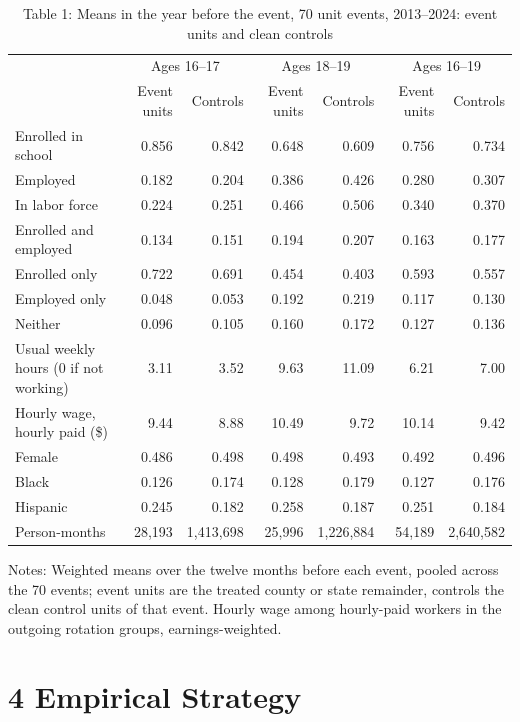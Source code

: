 \documentclass[12pt]{article}
\begin{document}
\begin{table}
\centering
\caption{Table 1: Means in the year before the event, 70 unit events, 2013--2024: event units and clean controls}

\small
\begin{tabular}{lrrrrrr}
\toprule
 & \multicolumn{2}{c}{Ages 16--17} & \multicolumn{2}{c}{Ages 18--19} & \multicolumn{2}{c}{Ages 16--19} \\

 & Event units & Controls & Event units & Controls & Event units & Controls \\
\midrule
Enrolled in school & 0.856 & 0.842 & 0.648 & 0.609 & 0.756 & 0.734 \\
Employed & 0.182 & 0.204 & 0.386 & 0.426 & 0.280 & 0.307 \\
In labor force & 0.224 & 0.251 & 0.466 & 0.506 & 0.340 & 0.370 \\
Enrolled and employed & 0.134 & 0.151 & 0.194 & 0.207 & 0.163 & 0.177 \\
Enrolled only & 0.722 & 0.691 & 0.454 & 0.403 & 0.593 & 0.557 \\
Employed only & 0.048 & 0.053 & 0.192 & 0.219 & 0.117 & 0.130 \\
Neither & 0.096 & 0.105 & 0.160 & 0.172 & 0.127 & 0.136 \\
Usual weekly hours (0 if not working) & 3.11 & 3.52 & 9.63 & 11.09 & 6.21 & 7.00 \\
Hourly wage, hourly paid (\$) & 9.44 & 8.88 & 10.49 & 9.72 & 10.14 & 9.42 \\
Female & 0.486 & 0.498 & 0.498 & 0.493 & 0.492 & 0.496 \\
Black & 0.126 & 0.174 & 0.128 & 0.179 & 0.127 & 0.176 \\
Hispanic & 0.245 & 0.182 & 0.258 & 0.187 & 0.251 & 0.184 \\
Person-months & 28,193 & 1,413,698 & 25,996 & 1,226,884 & 54,189 & 2,640,582 \\
\bottomrule
\end{tabular}



\noindent\small Notes: Weighted means over the twelve months before each event, pooled across the 70 events; event units are the treated county or state remainder, controls the clean control units of that event. Hourly wage among hourly-paid workers in the outgoing rotation groups, earnings-weighted.

\end{table}

\section{4 Empirical Strategy}
\end{document}
